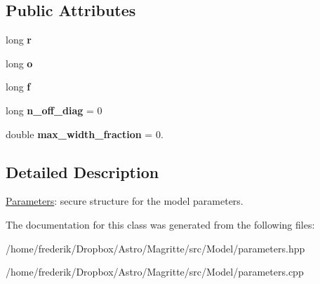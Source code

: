 \subsection*{Public Attributes}
\begin{DoxyCompactItemize}
\item 
\mbox{\label{classParameters_a0cff5f349621c95ed87d10db2a64520d}} 
long {\bfseries r}
\item 
\mbox{\label{classParameters_a8fa1130d41666c907c9f8ec993374fc3}} 
long {\bfseries o}
\item 
\mbox{\label{classParameters_a364ff2e8cafed3be6c00c8b709d6ed31}} 
long {\bfseries f}
\item 
\mbox{\label{classParameters_af147c2a5b9ed14cf18c8d61cd63cc4f3}} 
long {\bfseries n\+\_\+off\+\_\+diag} = 0
\item 
\mbox{\label{classParameters_af07bf93fa81400773c457787e11fe903}} 
double {\bfseries max\+\_\+width\+\_\+fraction} = 0.
\end{DoxyCompactItemize}


\subsection{Detailed Description}
\mbox{\hyperlink{classParameters}{Parameters}}\+: secure structure for the model parameters. 

The documentation for this class was generated from the following files\+:\begin{DoxyCompactItemize}
\item 
/home/frederik/\+Dropbox/\+Astro/\+Magritte/src/\+Model/parameters.\+hpp\item 
/home/frederik/\+Dropbox/\+Astro/\+Magritte/src/\+Model/parameters.\+cpp\end{DoxyCompactItemize}
